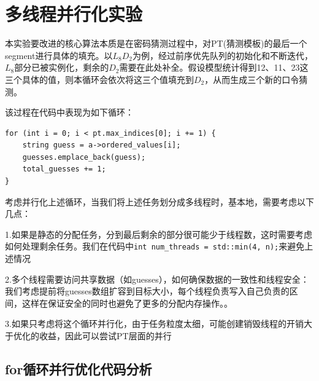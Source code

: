 \documentclass[a4paper]{article}
\begin{document}
\section{多线程并行化实验}
本实验要改进的核心算法本质是在密码猜测过程中，对PT(猜测模板)的最后一个segment进行具体的填充。以$L_8D_2$为例，经过前序优先队列的初始化和不断迭代，$L_8$部分已被实例化，剩余的$D_2$需要在此处补全。假设模型统计得到12、11、23这三个具体的值，则本循环会依次将这三个值填充到$D_2$，从而生成三个新的口令猜测。

该过程在代码中表现为如下循环：

\begin{lstlisting}[caption=核心循环伪代码]
for (int i = 0; i < pt.max_indices[0]; i += 1) {
    string guess = a->ordered_values[i];
    guesses.emplace_back(guess);
    total_guesses += 1;
}
\end{lstlisting}
\par 考虑并行化上述循环，当我们将上述任务划分成多线程时，基本地，需要考虑以下几点：
\par 1.如果是静态的分配任务，分到最后剩余的部分很可能少于线程数，这时需要考虑如何处理剩余任务。我们在代码中\texttt{int num\_threads = std::min(4, n);}来避免上述情况
\par 2.多个线程需要访问共享数据（如guesses），如何确保数据的一致性和线程安全：我们考虑提前将guesses数组扩容到目标大小，每个线程负责写入自己负责的区间，这样在保证安全的同时也避免了更多的分配内存操作。。
\par 3.如果只考虑将这个循环并行化，由于任务粒度太细，可能创建销毁线程的开销大于优化的收益，因此可以尝试PT层面的并行
\subsection{for循环并行优化代码分析}
\end{document}
